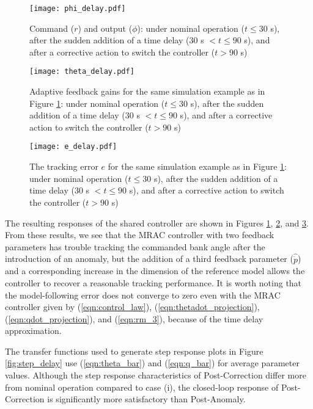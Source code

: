 \begin{figure}[h!]
	\centering
	\texttt{[image: phi\_delay.pdf]}
	\caption{Command ($r$) and output ($\phi$): under nominal operation ($t \leq 30$ s), after the sudden addition of a time delay ($30$ s $< t \leq 90$ s), and after a corrective action to switch the controller ($t > 90$ s)}
	\label{fig:command_and_output_d}
\end{figure}

\begin{figure}[h!]
	\centering
	\texttt{[image: theta\_delay.pdf]}
	\caption{Adaptive feedback gains for the same simulation example as in Figure \ref{fig:command_and_output_d}: under nominal operation ($t \leq 30$ s), after the sudden addition of a time delay ($30$ s $< t \leq 90$ s), and after a corrective action to switch the controller ($t > 90$ s)}
	\label{fig:theta_d}
\end{figure}

\begin{figure}[h!]
	\centering
	\texttt{[image: e\_delay.pdf]}
	\caption{The tracking error $e$ for the same simulation example as in Figure \ref{fig:command_and_output_d}: under nominal operation ($t \leq 30$ s), after the sudden addition of a time delay ($30$ s $< t \leq 90$ s), and after a corrective action to switch the controller ($t > 90$ s)}
	\label{fig:error_d}
\end{figure}

The resulting responses of the shared controller are shown in Figures \ref{fig:command_and_output_d}, \ref{fig:theta_d}, and \ref{fig:error_d}. From these results, we see that the MRAC controller with two feedback parameters has trouble tracking the commanded bank angle after the introduction of an anomaly, but the addition of a third feedback parameter ($\hat{\dot{p}}$) and a corresponding increase in the dimension of the reference model allows the controller to recover a reasonable tracking performance. It is worth noting that the model-following error does not converge to zero even with the MRAC controller given by (\ref{eqn:control_law}), (\ref{eqn:thetadot_projection}), (\ref{eqn:qdot_projection}), and (\ref{eqn:rm_3}), because of the time delay approximation. 

The transfer functions used to generate step response plots in Figure \ref{fig:step_delay} use (\ref{eqn:theta_bar}) and (\ref{eqn:q_bar}) for average parameter values. Although the step response characteristics of Post-Correction differ more from nominal operation compared to case (i), the closed-loop response of Post-Correction is significantly more satisfactory than Post-Anomaly.

